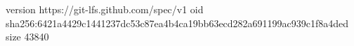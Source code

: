 version https://git-lfs.github.com/spec/v1
oid sha256:6421a4429c1441237dc53c87ea4b4ca19bb63ecd282a691199ac939c1f8a4ded
size 43840
